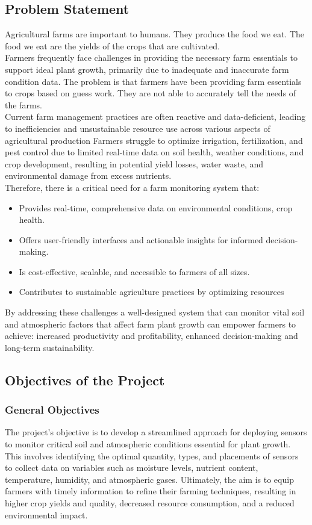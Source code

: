 \documentclass[12pt, a4paper]{article}
\begin{document}
\subsection{Problem Statement}
Agricultural farms are important to humans. They produce the food we eat. The food we eat are the yields of the crops that are cultivated.\\
Farmers frequently face challenges in providing the necessary farm essentials to support ideal plant growth, primarily due to inadequate and inaccurate farm condition data. The problem is that farmers have been providing farm essentials to crops based on guess work. They are not able to accurately tell the needs of the farms.
\\
Current farm management practices are often reactive and data-deficient, leading to inefficiencies and unsustainable resource use across various aspects of agricultural production Farmers struggle to optimize irrigation, fertilization, and pest control due to limited real-time data on soil health, weather conditions, and crop development, resulting in potential yield losses, water waste, and environmental damage from excess nutrients.
\\
Therefore, there is a critical need for a farm monitoring system that:
\begin{itemize}
 \item Provides real-time, comprehensive data on environmental conditions, crop health.
 \item Offers user-friendly interfaces and actionable insights for informed decision-making.
 \item Is cost-effective, scalable, and accessible to farmers of all sizes.
 \item Contributes to sustainable agriculture practices by optimizing resources
\end{itemize}
By addressing these challenges a well-designed system that can monitor vital soil and atmospheric factors that affect farm plant growth can empower farmers to achieve: increased productivity and profitability, enhanced decision-making and long-term sustainability.



\newpage
\subsection{Objectives of the Project}
\subsubsection{General Objectives}
The project's objective is to develop a streamlined approach for deploying sensors to monitor critical soil and atmospheric conditions essential for plant growth. This involves identifying the optimal quantity, types, and placements of sensors to collect data on variables such as moisture levels, nutrient content, temperature, humidity, and atmospheric gases. Ultimately, the aim is to equip farmers with timely information to refine their farming techniques, resulting in higher crop yields and quality, decreased resource consumption, and a reduced environmental impact.
\end{document}
